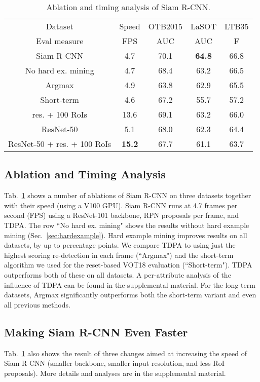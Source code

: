\documentclass[10pt,twocolumn,letterpaper]{article}
\begin{document}
\begin{table}[t]
\centering{}\footnotesize
\setlength{\tabcolsep}{3pt}

\begin{tabular}{ccccc}
\toprule 
Dataset & Speed & OTB2015 & LaSOT & LTB35\tabularnewline
Eval measure & FPS & AUC & AUC & F\tabularnewline
\midrule
Siam R-CNN & 4.7 & 70.1 & \textbf{64.8} & 66.8\tabularnewline
\midrule
No hard ex. mining & 4.7 & 68.4 & 63.2 & 66.5\tabularnewline
\midrule
Argmax & 4.9 & 63.8 & 62.9 & 65.5\tabularnewline
Short-term & 4.6 & 67.2 & 55.7 & 57.2\tabularnewline
\midrule
res. + 100 RoIs & 13.6 & 69.1 & 63.2 & 66.0\tabularnewline
ResNet-50 & 5.1 & 68.0 & 62.3 & 64.4\tabularnewline
ResNet-50 + res. + 100 RoIs & \textbf{15.2} & 67.7 & 61.1 & 63.7\tabularnewline
\bottomrule

\end{tabular}\caption{\label{tab:ablations}Ablation and timing analysis of Siam R-CNN.}
\end{table} 

\subsection{Ablation and Timing Analysis}
Tab.~\ref{tab:ablations} shows a number of ablations of Siam R-CNN on three datasets together with their speed (using a V100 GPU). Siam R-CNN runs at 4.7 frames per second (FPS) using a ResNet-101 backbone,  RPN proposals per frame, and TDPA. The row ``No hard ex. mining" shows the results without hard example mining (\cf Sec.~\ref{sec:hardexample}). Hard example mining improves results on all datasets, by up to  percentage points.
We compare TDPA to using just the highest scoring re-detection in each frame (``Argmax") and the short-term algorithm we used for the reset-based VOT18 evaluation (``Short-term"). TDPA outperforms both of these on all datasets. A per-attribute analysis of the influence of TDPA can be found in the supplemental material.
For the long-term datasets, Argmax significantly outperforms both the short-term variant and even all previous methods.

\subsection{Making Siam R-CNN Even Faster}
\label{subsec:faster}
Tab.~\ref{tab:ablations} also shows the result of three changes aimed at increasing the speed of Siam R-CNN (smaller backbone, smaller input resolution, and less RoI proposals). More details and analyses are in the supplemental material.
\end{document}
